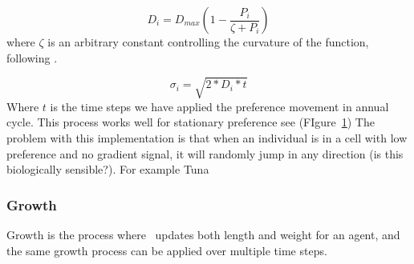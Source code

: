 \begin{equation}
D_i = D_{max}\left(1 - \frac{P_i}{\zeta + P_i}\right)
\end{equation}
%
where $\zeta$ is an arbitrary constant controlling the curvature of the function, following \cite{Bertignac1998}.

\begin{equation}
\sigma_i = \sqrt{2 * D_i * t}
\end{equation}
%
Where $t$ is the time steps we have applied the preference movement in annual cycle. This process works well for stationary preference see (FIgure~\ref{fig:static_pref}) The problem with this implementation is that when an individual is in a cell with low preference and no gradient signal, it will randomly jump in any direction (is this biologically sensible?). For example Tuna

\begin{figure}[htp]\label{fig:pref}%
	\centering
	\qquad
	\label{fig:static_pref}%
\end{figure}




\subsubsection{Growth}\label{sec:age-at-age}
Growth is the process where \IBM\ updates both length and weight for an agent, and the same growth process can be applied over multiple time steps.
